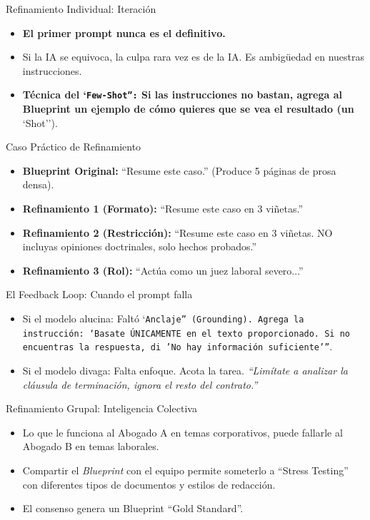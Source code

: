 \documentclass[aspectratio=169]{beamer}
\begin{document}
\begin{frame}{Refinamiento Individual: Iteración}

\begin{itemize}
  \item \textbf{El primer prompt nunca es el definitivo.}
  \item Si la IA se equivoca, la culpa rara vez es de la IA. Es ambigüedad en nuestras instrucciones.
  \item \textbf{Técnica del `\texttt{Few-Shot'':} Si las instrucciones no bastan, agrega al Blueprint un ejemplo de cómo quieres que se vea el resultado (un }`Shot'').
\end{itemize}
\end{frame}

\begin{frame}{Caso Práctico de Refinamiento}

\begin{itemize}
  \item \textbf{Blueprint Original:} ``Resume este caso.'' (Produce 5 páginas de prosa densa).
  \item \textbf{Refinamiento 1 (Formato):} ``Resume este caso en 3 viñetas.''
  \item \textbf{Refinamiento 2 (Restricción):} ``Resume este caso en 3 viñetas. NO incluyas opiniones doctrinales, solo hechos probados.''
  \item \textbf{Refinamiento 3 (Rol):} ``Actúa como un juez laboral severo...''
\end{itemize}
\end{frame}

\begin{frame}{El Feedback Loop: Cuando el prompt falla}

\begin{itemize}
  \item Si el modelo alucina: Faltó `\texttt{Anclaje'' (Grounding). Agrega la instrucción: \textit{}`Basate ÚNICAMENTE en el texto proporcionado. Si no encuentras la respuesta, di 'No hay información suficiente'''}.
  \item Si el modelo divaga: Falta enfoque. Acota la tarea. \textit{``Limítate a analizar la cláusula de terminación, ignora el resto del contrato.''}
\end{itemize}
\end{frame}

\begin{frame}{Refinamiento Grupal: Inteligencia Colectiva}

\begin{itemize}
  \item Lo que le funciona al Abogado A en temas corporativos, puede fallarle al Abogado B en temas laborales.
  \item Compartir el \textit{Blueprint} con el equipo permite someterlo a ``Stress Testing'' con diferentes tipos de documentos y estilos de redacción.
  \item El consenso genera un Blueprint ``Gold Standard''.
\end{itemize}
\end{frame}
\end{document}
